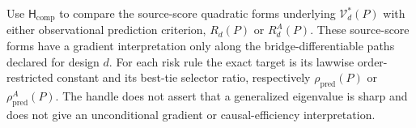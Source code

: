 Use \(\mathsf H_{\mathrm{comp}}\) to compare the source-score quadratic forms underlying \(\mathcal V_d^*(P)\) with either observational prediction criterion, \(R_d(P)\) or \(R_d^A(P)\).  These source-score forms have a gradient interpretation only along the bridge-differentiable paths declared for design \(d\).  For each risk rule the exact target is its lawwise order-restricted constant and its best-tie selector ratio, respectively \(\rho_{\mathrm{pred}}(P)\) or \(\rho_{\mathrm{pred}}^A(P)\).  The handle does not assert that a generalized eigenvalue is sharp and does not give an unconditional gradient or causal-efficiency interpretation.